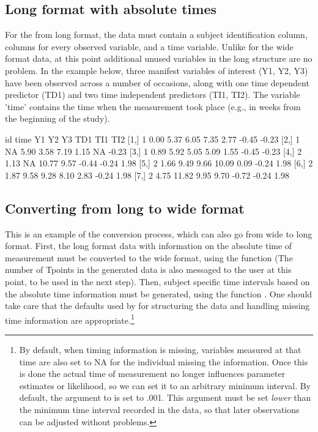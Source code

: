 \documentclass[nojss]{jss}\usepackage[]{graphicx}\usepackage[]{color}
\begin{document}
\subsection{Long format with absolute times} \label{sec:datalong}\nopagebreak 
For the from long format, the data must contain a subject identification column, columns for every observed variable, and a time variable. Unlike for the wide format data, at this point additional unused variables in the long structure are no problem. In the example below, three manifest variables of interest (Y1, Y2, Y3) have been observed across a number of occasions, along with one time dependent predictor (TD1) and two time independent predictors (TI1, TI2). The variable 'time' contains the time when the measurement took place (e.g., in weeks from the beginning of the study). 

\begin{Schunk}
\begin{Soutput}
     id time    Y1    Y2    Y3   TD1   TI1   TI2
[1,]  1 0.00  5.37  6.05  7.35  2.77 -0.45 -0.23
[2,]  1   NA  5.90  3.58  7.19  1.15    NA -0.23
[3,]  1 0.89  5.92  5.05  5.09  1.55 -0.45 -0.23
[4,]  2 1.13    NA 10.77  9.57 -0.44 -0.24  1.98
[5,]  2 1.66  9.49  9.66 10.09  0.09 -0.24  1.98
[6,]  2 1.87  9.58  9.28  8.10  2.83 -0.24  1.98
[7,]  2 4.75 11.82  9.95  9.70 -0.72 -0.24  1.98
\end{Soutput}
\end{Schunk}

\subsection{Converting from long to wide format}
This is an example of the conversion process, which can also go from wide to long format. First, the long format data with information on the absolute time of measurement must be converted to the wide format, using the  function (The number of Tpoints in the generated data is also messaged to the user at this point, to be used in the next step). Then, subject specific time intervals based on the absolute time information must be generated, using the function . One should take care that the defaults used by  for structuring the data and handling missing time information are appropriate.\footnote{By default, when timing information is missing, variables measured at that time are also set to NA for the individual missing the information. Once this is done the actual time of measurement no longer influences parameter estimates or likelihood, so we can set it to an arbitrary minimum interval. By default, the  argument to  is set to .001. This argument must be set \textit{lower} than the minimum time interval recorded in the data, so that later observations can be adjusted without problems.}
\end{document}
